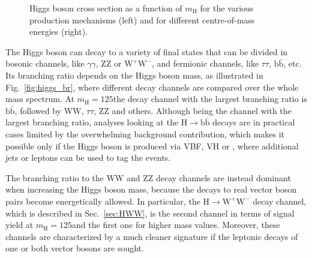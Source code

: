 \begin{figure}[htb]
\centering
{}
\caption{Higgs boson cross section as a function of $m_\mathrm{H}$ for the various production mechanisms (left) and for different centre-of-mass energies (right).}\label{fig:higgs_xsec}
\end{figure}

The Higgs boson can decay to a variety of final states that can be divided in bosonic channels, like $\gamma\gamma$, ZZ or $\mathrm{W^+W^-}$, and fermionic channels, like $\tau\tau$, $\mathrm{b\bar b}$, etc.
Its branching ratio depends on the Higgs boson mass, as illustrated in Fig.~\ref{fig:higgs_br}, where different decay channels are compared over the whole mass spectrum. At $m_\mathrm{H} = 125$\GeV the decay channel with the largest branching ratio is $\mathrm{b\bar b}$, followed by WW, $\tau\tau$, ZZ and others. Although being the channel with the largest branching ratio, analyses looking at the H$\to \mathrm{b \bar b}$ decays are in practical cases limited by the overwhelming background contribution, which makes it possible only if the Higgs boson is produced via VBF, VH or \ttH, where additional jets or leptons can be used to tag the events.

The branching ratio to the WW and ZZ decay channels are instead dominant when increasing the Higgs boson mass, because the decays to real vector boson pairs become energetically allowed. In particular, the H$\to \mathrm{W^+W^-}$ decay channel, which is described in Sec.~\ref{sec:HWW}, is the second channel in terms of signal yield at $m_\mathrm{H} = 125$\GeV and the first one for higher mass values. Moreover, these channels are characterized by a much cleaner signature if the leptonic decays of one or both vector bosons are sought.

